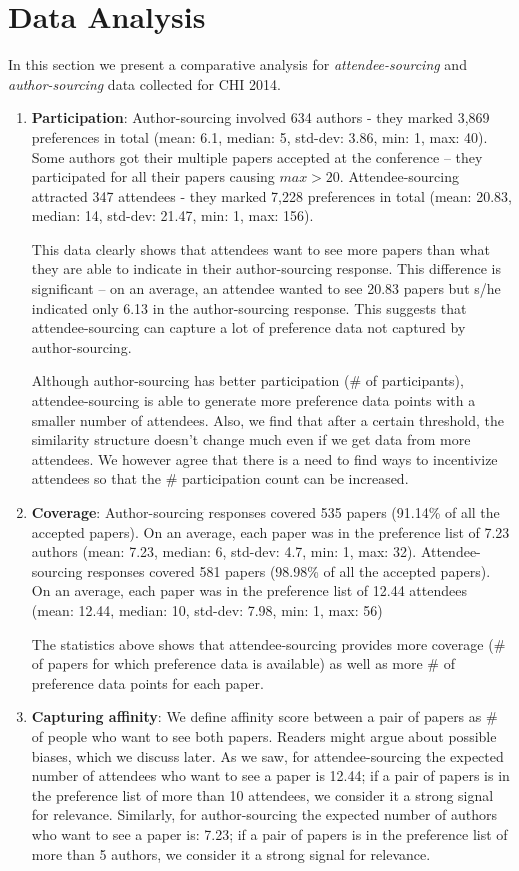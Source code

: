 \documentclass[letterpaper]{article}
\begin{document}
\section{Data Analysis}
In this section we present a comparative analysis for \emph{attendee-sourcing} and \emph{author-sourcing} data collected for CHI 2014. 
\begin{enumerate}
\item \textbf{Participation}: Author-sourcing involved 634 authors - they marked 3,869 preferences in total (mean: 6.1, median: 5, std-dev: 3.86, min: 1, max: 40). Some authors got their multiple papers accepted at the conference -- they participated for all their papers causing  $max > 20$. Attendee-sourcing attracted 347 attendees - they marked 7,228 preferences in total (mean: 20.83, median: 14, std-dev: 21.47, min: 1, max: 156).

This data clearly shows that attendees want to see more papers than what they are able to indicate in their author-sourcing response. This difference is significant -- on an average, an attendee wanted to see 20.83 papers but s/he indicated only 6.13 in the author-sourcing response. This suggests that attendee-sourcing can capture a lot of preference data not captured by author-sourcing.

Although author-sourcing has better participation (\# of participants), attendee-sourcing is able to generate more preference data points with a smaller number of attendees. Also, we find that after a certain threshold, the similarity structure doesn't change much even if we get data from more attendees. We however agree that there is a need to find ways to incentivize attendees so that the \# participation count can be increased.

\item \textbf{Coverage}: Author-sourcing responses covered 535 papers (91.14\% of all the accepted papers). On an average, each paper was in the preference list of 7.23 authors (mean: 7.23, median: 6, std-dev: 4.7, min: 1, max: 32). Attendee-sourcing responses covered 581 papers (98.98\% of all the accepted papers). On an average, each paper was in the preference list of 12.44 attendees (mean: 12.44, median: 10, std-dev: 7.98, min: 1, max: 56)

The statistics above shows that attendee-sourcing provides more coverage (\# of papers for which preference data is available) as well as more \# of preference data points for each paper.

\item \textbf{Capturing affinity}: We define affinity score between a pair of papers as \# of people who want to see both papers. Readers might argue about possible biases, which we discuss later. As we saw, for attendee-sourcing the expected number of attendees who want to see a paper is 12.44; if a pair of papers is in the preference list of more than 10 attendees, we consider it a strong signal for relevance. Similarly, for author-sourcing the expected number of authors who want to see a paper is: 7.23; if a pair of papers is in the preference list of more than 5 authors, we consider it a strong signal for relevance.


\end{enumerate}
\end{document}
